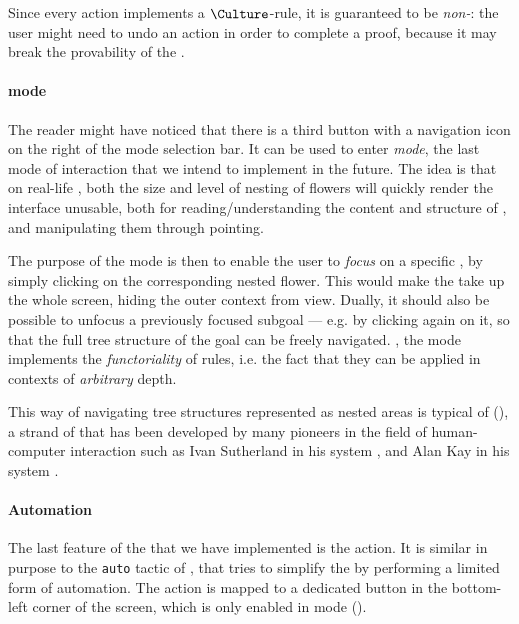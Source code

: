 Since every \Edit action implements a $\Culture$-rule, it is guaranteed to be
\emph{non-}: the user might need to undo an \Edit action in order to
complete a proof, because it may break the provability of the .

\paragraph{\Navigation mode}

The reader might have noticed that there is a third button with a navigation
icon on the right of the mode selection bar. It can be used to enter
\emph{\Navigation mode}, the last mode of interaction that we intend to implement
in the future. The idea is that on real-life , both the size and level of
nesting of flowers will quickly render the interface unusable, both for
reading/understanding the content and structure of , and manipulating them
through pointing.

The purpose of the \Navigation mode is then to enable the user to \emph{focus} on
a specific , by simply clicking on the corresponding nested flower. This
would make the  take up the whole screen, hiding the outer context from
view. Dually, it should also be possible to unfocus a previously focused subgoal
--- e.g. by clicking again on it, so that the full tree structure of the goal
can be freely navigated. , the \Navigation mode implements the
\emph{functoriality} of rules, i.e. the fact that they can be applied in
contexts of \emph{arbitrary} depth.

\begin{remark}
This way of navigating tree structures represented as nested areas is typical of
 (), a strand of  that has been developed
by many pioneers in the field of human-computer interaction such as Ivan
Sutherland in his  system , and
Alan Kay in his  system
.
\end{remark}

\paragraph{Automation}

The last feature of the  that we have implemented is the
 \Proof action. It is similar in purpose to the \texttt{auto}
tactic of , that tries to simplify the  by performing a limited form of
automation. The  action is mapped to a dedicated button in the
bottom-left corner of the screen, which is only enabled in \Proof mode
().

